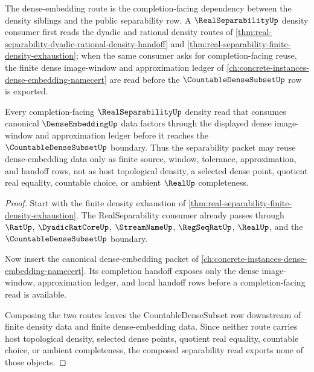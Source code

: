 The dense-embedding route is the completion-facing dependency between the density siblings and the public separability row. A $\RealSeparabilityUp$ density consumer first reads the dyadic and rational density routes of \autoref{thm:real-separability-dyadic-rational-density-handoff} and \autoref{thm:real-separability-finite-density-exhaustion}; when the same consumer asks for completion-facing reuse, the finite dense image-window and approximation ledger of \autoref{ch:concrete-instances-dense-embedding-namecert} are read before the $\CountableDenseSubsetUp$ row is exported.

\begin{theorem}\label{thm:real-separability-dense-embedding-route}
Every completion-facing $\RealSeparabilityUp$ density read that consumes canonical $\DenseEmbeddingUp$ data factors through the displayed dense image-window and approximation ledger before it reaches the $\CountableDenseSubsetUp$ boundary. Thus the separability packet may reuse dense-embedding data only as finite source, window, tolerance, approximation, and handoff rows, not as host topological density, a selected dense point, quotient real equality, countable choice, or ambient $\RealUp$ completeness.
\end{theorem}
\begin{proof}
Start with the finite density exhaustion of \autoref{thm:real-separability-finite-density-exhaustion}. The RealSeparability consumer already passes through $\RatUp$, $\DyadicRatCoreUp$, $\StreamNameUp$, $\RegSeqRatUp$, $\RealUp$, and the $\CountableDenseSubsetUp$ boundary.

Now insert the canonical dense-embedding packet of \autoref{ch:concrete-instances-dense-embedding-namecert}. Its completion handoff exposes only the dense image-window, approximation ledger, and local handoff rows before a completion-facing read is available.

Composing the two routes leaves the CountableDenseSubset row downstream of finite density data and finite dense-embedding data. Since neither route carries host topological density, selected dense points, quotient real equality, countable choice, or ambient completeness, the composed separability read exports none of those objects.
\end{proof}
